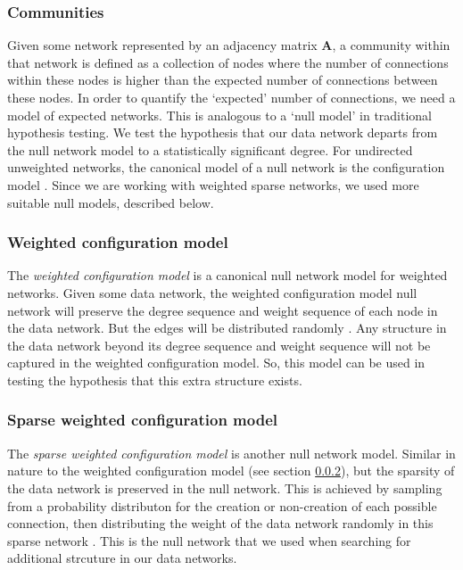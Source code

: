 \documentclass[a4paper,12pt]{article}
\theoremstyle{definition}
\begin{document}
        \subsubsection{Communities}
        Given some network represented by an adjacency matrix $\mathbf{A}$, a community within that network is defined as a collection of nodes where the number of connections within these nodes is higher than the expected number of connections between these nodes. In order to quantify the `expected' number of connections, we need a model of expected networks. This is analogous to a `null model' in traditional hypothesis testing. We test the hypothesis that our data network departs from the null network model to a statistically significant degree. For undirected unweighted networks, the canonical model of a null network is the configuration model \cite{fosdick}. Since we are working with weighted sparse networks, we used more suitable null models, described below.

        \subsubsection{Weighted configuration model}\label{sec:weight_configuration_model}
        The \textit{weighted configuration model} is a canonical null network model for weighted networks. Given some data network, the weighted configuration model null network will preserve the degree sequence and weight sequence of each node in the data network. But the edges will be distributed randomly \cite{fosdick}. Any structure in the data network beyond its degree sequence and weight sequence will not be captured in the weighted configuration model. So, this model can be used in testing the hypothesis that this extra structure exists.

        \subsubsection{Sparse weighted configuration model}\label{sec:sparse_weighted_configuration_model}
        The \textit{sparse weighted configuration model} is another null network model. Similar in nature to the weighted configuration model (see section \ref{sec:weight_configuration_model}), but the sparsity of the data network is preserved in the null network. This is achieved by sampling from a probability distributon for the creation or non-creation of each possible connection, then distributing the weight of the data network randomly in this sparse network \cite{humphries}. This is the null network that we used when searching for additional strcuture in our data networks.
\end{document}
